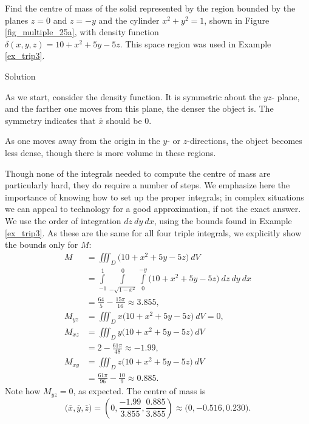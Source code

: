 \begin{example}
\label{ex_trip8}
Find the centre of mass of the solid represented by the region bounded by the planes $z=0$ and $z=-y$ and the cylinder $x^2+y^2=1$, shown in Figure \ref{fig_multiple_25a}, with density function \\ $\delta(x,y,z) = 10+x^2+5y-5z$. This space region was used in Example \ref{ex_trip3}.


Solution 

As we start, consider the density function. It is symmetric about the $yz$- plane, and the farther one moves from this plane, the denser the object is. The symmetry indicates that $\overline x$ should be 0. 


As one moves away from the origin in the $y$- or $z$-directions, the object becomes less dense, though there is more volume in these regions.  

Though none of the integrals needed to compute the centre of mass are particularly hard, they do require a number of steps. We emphasize here the importance of knowing how to set up the proper integrals; in complex situations we can appeal to technology for a good approximation, if not the exact answer. We use the order of integration $dz\ dy\ dx$, using the bounds found in Example \ref{ex_trip3}. As these are the same for all four triple integrals, we explicitly show the bounds only for $M$:
\allowdisplaybreaks
\begin{align*}
M &= \iiint_D \big(10+x^2+5y-5z\big)\ dV \\[0.2cm]
	&= \int\limits_{-1}^1\int\limits_{-\sqrt{1-x^2}}^0\int\limits_0^{-y} \big(10+x^2+5y-5z\big)\ dz\ dy\ dx\\[0.2cm]
	&= \frac{64}5-\frac{15\pi}{16} \approx 3.855,\\[0.2cm]
M_{yz}	&= \iiint_D x\big(10+x^2+5y-5z\big)\ dV = 0, \\[0.2cm]%
M_{xz} &= \iiint_D y\big(10+x^2+5y-5z\big)\ dV\\[0.2cm]
	&= 2-\frac{61\pi}{48}\approx -1.99,\\[0.2cm]
	M_{xy}	&= \iiint_D z\big(10+x^2+5y-5z\big)\ dV \\[0.2cm]
	&= \frac{61\pi}{96}-\frac{10}9\approx 0.885.
\end{align*}
Note how $M_{yz}=0$, as expected. The centre of mass is
$$\big(\overline{x},\overline{y},\overline{z}\big) = \left(0,\frac{-1.99}{3.855},\frac{0.885}{3.855}\right) \approx \big(0,-0.516, 0.230\big).$$
\end{example}



